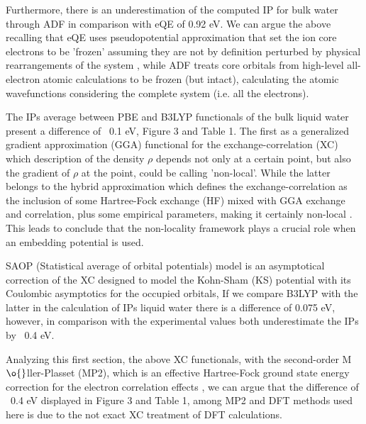 \documentclass[12pt,a4paper]{article}
\begin{document}
Furthermore, there is an underestimation of the computed IP for bulk water through ADF in comparison with eQE of 0.92 eV. We can argue the above
recalling that eQE uses pseudopotential approximation that set the ion core electrons to be 'frozen' assuming they are not by definition perturbed
by physical rearrangements of the system \cite{srivastava1987theory}, while ADF treats core orbitals from high-level all-electron atomic calculations
to be frozen (but intact), calculating the atomic wavefunctions considering the complete system (i.e. all the electrons)\cite{te2001chemistry}.

The IPs average between PBE and B3LYP functionals of the bulk liquid water present a difference of ~0.1 eV, Figure 3 and Table 1. The first as a
generalized gradient approximation (GGA) functional for the exchange-correlation (XC) which description of the density $\rho$ depends not only 
at a certain point, but also the gradient of $\rho$ at the point, could be calling 'non-local'\cite{perdew1996phys}. While the latter belongs
to the hybrid approximation which defines the exchange-correlation as the inclusion of some Hartree-Fock exchange (HF) mixed with GGA
exchange and correlation, plus some empirical parameters, making it certainly non-local \cite{hertwig1997parameterization}. 
This leads to conclude that the non-locality framework plays a crucial role when an embedding potential is used. 

SAOP (Statistical average of orbital potentials) model is an asymptotical correction of the XC designed to model
the Kohn-Sham (KS) potential with its Coulombic asymptotics for the occupied orbitals\cite{chong2002interpretation, van2014physical},
If we compare B3LYP with the latter in the calculation of IPs liquid water there is a difference of 0.075 eV, however, in comparison with the experimental values both underestimate the IPs by ~0.4 eV. 

Analyzing this first section, the above XC functionals, with the second-order M$\o{}$ller-Plasset (MP2), which is an effective Hartree-Fock
ground state energy correction for the electron correlation effects \cite{del2012second}, we can argue that the difference of ~0.4 eV displayed in
Figure 3 and Table 1, among MP2 and DFT methods used here is due to the not exact XC treatment of DFT calculations.
\end{document}
